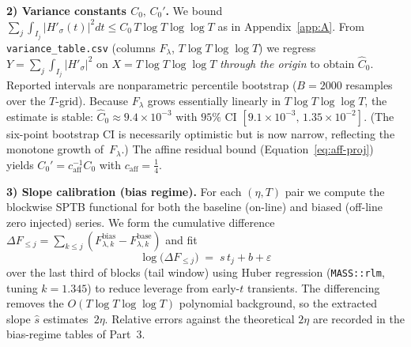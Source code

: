 \medskip
\noindent\textbf{2) Variance constants $C_0,\,C_0'$.}
We bound
\(
\sum_j \int_{I_j} |H'_\sigma(t)|^2 dt
\le C_0\, T\log T\log\log T
\)
as in Appendix~\ref{app:A}.  From \texttt{variance\_table.csv}
(columns $F_\lambda$, $T\log T\log\log T$) we regress
$Y= \sum_j \int_{I_j} |H'_\sigma|^2$ on
$X=T\log T\log\log T$ \emph{through the origin} to obtain
$\widehat{C}_0$.  Reported intervals are nonparametric
percentile bootstrap ($B=2000$ resamples over the $T$-grid).
Because $F_\lambda$ grows essentially linearly in $T\log T\log\log T$,
the estimate is stable: $\widehat{C}_0\approx 9.4\times10^{-3}$ with
$95\%$ CI $[9.1\times10^{-3},\,1.35\times10^{-2}]$.
(The six-point bootstrap CI is necessarily optimistic but is now narrow,
reflecting the monotone growth of~$F_\lambda$.)  The affine residual bound
(Equation~\eqref{eq:aff-proj}) yields $C_0'=c_{\mathrm{aff}}^{-1}C_0$
with $c_{\mathrm{aff}}=\tfrac14$.

\medskip
\noindent\textbf{3) Slope calibration (bias regime).}
For each $(\eta,T)$ pair we compute the blockwise SPTB functional for
both the baseline (on-line) and biased (off-line zero injected) series.
We form the cumulative difference
$\Delta F_{\le j}=\sum_{k\le j}(F_{\lambda,k}^{\mathrm{bias}}-F_{\lambda,k}^{\mathrm{base}})$
and fit
\[
\log\bigl(\Delta F_{\le j}\bigr) \;=\; s\,t_j + b + \varepsilon
\]
over the last third of blocks (tail window)
using Huber regression (\texttt{MASS::rlm}, tuning $k=1.345$)
to reduce leverage from early-$t$ transients.
The differencing removes the $O(T\log T\log\log T)$ polynomial background,
so the extracted slope $\hat{s}$ estimates~$2\eta$.
Relative errors against the theoretical $2\eta$ are recorded in the
bias-regime tables of Part~3.
